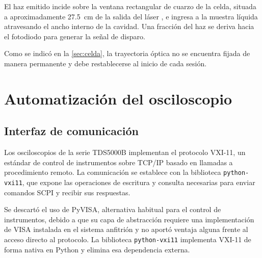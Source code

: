 El haz emitido incide sobre la ventana rectangular de cuarzo de la
celda, situada a aproximadamente \SI{27.5}{\centi\meter} de la salida
del láser \cite{Rangel2023}, e ingresa a la muestra líquida
atravesando el ancho interno de la cavidad. Una fracción del haz se
deriva hacia el fotodiodo para generar la señal de disparo.

Como se indicó en la \cref{sec:celda}, la trayectoria óptica no se
encuentra fijada de manera permanente y debe restablecerse al inicio
de cada sesión.



\section{Automatización del osciloscopio}
\label{sec:auto_osci}

\subsection*{Interfaz de comunicación}

Los osciloscopios de la serie TDS5000B implementan el protocolo
VXI-11, un estándar de control de instrumentos sobre TCP/IP basado en
llamadas a procedimiento remoto. La comunicación se establece con la
biblioteca \texttt{python-vxi11}, que expone las operaciones de
escritura y consulta necesarias para enviar comandos SCPI y recibir
sus respuestas.

Se descartó el uso de PyVISA, alternativa habitual para el control de
instrumentos, debido a que su capa de abstracción requiere una
implementación de VISA instalada en el sistema anfitrión y no aportó
ventaja alguna frente al acceso directo al protocolo. La biblioteca
\texttt{python-vxi11} implementa VXI-11 de forma nativa en Python y
elimina esa dependencia externa.


